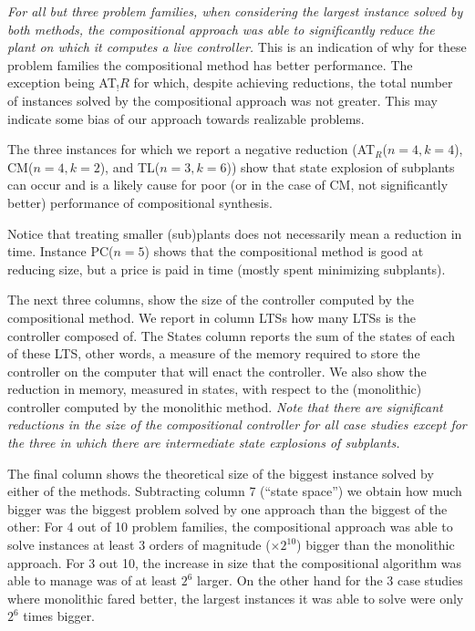 \textit{For all but three problem families, when considering the largest instance solved by both methods, the compositional approach was able to significantly reduce the plant on which it computes a live controller.} This is an indication of why for these problem families the compositional method has better performance. The exception being 
AT$_!R$ for which, despite achieving reductions, the total number of instances solved by the compositional approach was not greater. This may indicate some bias of our approach towards realizable problems. 

 The three instances for which we report a negative reduction  (AT$_R$($n=4,k=4$), CM($n=4,k=2$), and TL($n=3, k=6$)) show that state explosion of subplants  can  occur and is a likely cause for poor (or in the case of CM, not significantly better) performance of compositional synthesis.


Notice that treating smaller  (sub)plants does not necessarily mean a reduction in time. Instance PC($n=5$) shows that the compositional method is good at reducing size, but a price is paid in time (mostly spent minimizing subplants).  

The next three columns, show the size of the controller computed by the compositional method. We report in column LTSs how many LTSs is the controller composed of. The States column reports the sum of the states of each of these LTS, other words, a measure of the memory required to store the controller on the computer that will enact the controller. We also show the reduction in memory, measured in states, with respect to the (monolithic) controller computed by the monolithic method. \textit{Note that there are significant reductions in the size of the compositional controller for all case studies except for the three in which there are  intermediate state explosions of subplants.}

The final column shows the theoretical size of the biggest instance solved by either of the methods. Subtracting column 7 (``state space'') we obtain how much bigger was the biggest problem solved by one approach than the biggest of the other: For 4 out of 10 problem families, the compositional approach was able to solve instances at least 3 orders of magnitude  ($\times 2^{10}$) bigger than the monolithic approach. For 3 out 10, the increase in size that the compositional algorithm was able to manage was of at least $2^{6}$ larger. On the other hand for the 3 case studies where monolithic fared better, the largest instances it was able to solve were only $2^{6}$ times bigger. 
 


